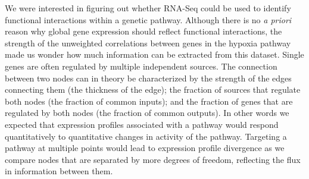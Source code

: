 \documentclass[9pt,twocolumn,twoside]{pnas-new}
\begin{document}
We were interested in figuring out whether RNA-Seq could be used to identify
functional interactions within a genetic pathway. Although there is no \emph{a
priori} reason why global gene expression should reflect functional interactions,
the strength of the unweighted correlations between genes in the hypoxia pathway
made us wonder how much information can be extracted from this dataset. Single
genes are often regulated by multiple independent sources. The connection between
two nodes can in theory be characterized by the strength of the edges connecting
them (the thickness of the edge); the fraction of sources that regulate both
nodes (the fraction of common inputs); and the fraction of genes that are
regulated by both nodes (the fraction of common outputs).
In other words we expected that expression profiles associated with a pathway
would respond quantitatively to quantitative changes in activity of the pathway.
Targeting a pathway at multiple points would lead to expression profile
divergence as we compare nodes that are separated by more degrees of freedom,
reflecting the flux in information between them.
\end{document}
